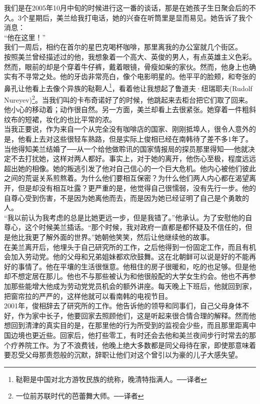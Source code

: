 我们是在2005年10月中旬的时候进行这一番的谈话，那是在她孩子生日聚会后的不久。3个星期后，美兰给我打电话，她的兴奋在听筒里是显而易见。她告诉了我个消息：\\

“他在这里！”\\

我们一周后，相约在首尔的星巴克喝杯咖啡，那里离我的办公室就几个街区。\\

按照美兰曾经描述过的他，我想象着一个高大、英俊的男人，有点英雄主义色彩。然而，眼前的却是个穿着牛仔裤，戴着眼镜，骨瘦如柴的家伙。然而，他身上也确实有不寻常之处。他的牙齿非常亮白，像个电影明星的。他平平的脸颊，和夸张的鼻孔让他看上去像个异族的鞑靼人\footnote{鞑靼是中国对北方游牧民族的统称，晚清特指满人。──译者}，看着他让我想起了鲁道夫·纽瑞耶夫(Rudolf Nureyev)\footnote{一位前苏联时代的芭蕾舞大师。──译者}。当我们叫的卡布奇诺好了的时候，他跳起来去柜台把它们取了回来。他小心的移动着；动作很自然。另一方面，美兰却看上去很紧张。她穿着一件粗斜纹布的短裙，妆化的也比平常的浓。\\

当我正要说，作为来自一个从完全没有咖啡店的国家、刚刚抵埠人，很令人意外的是，他看上去对这些很轻车熟路，但是实际上俊相已经在南韩待了差不多1年了。当他得知美兰结婚了──从一个给他做聆讯的国家情报局的探员那里得知──他就决定不去打扰她，这样对两人都好。事实上，对于她的离开，他伤心至极，程度远远超出她的相像。她的叛逃引发了他对自己信心的一个巨大危机。他内心被他们彼此之间的荒诞关系煎熬着。为什么他们要相互保密？为什么他们两人内心都在渴望离开，但是却没有相互吐露？更严重的是，他觉得自己很懦弱，没有先行一步。他的自尊心受到伤害，不是因为她离他而去，而是因为她已经证明了自己是个勇敢的人。\\

“我以前认为我考虑的总是比她更远一步，但是我错了。”他承认。为了安慰他的自尊心，这个时候美兰插话。“那个时候，我对政府一直都是都怀疑及不信任的，但是他比我更了解外面的世界。”她朝他笑笑，然后让他继续他的故事。\\

在美兰离开后，他埋头于自己研究所的工作，之后他得到一份固定工作，而且有机会加入劳动党。他的父母和兄弟姐妹都欢欣鼓舞。这在北朝鲜可以说是好的不能再好的事情了。他在平壤的生活很惬意。他租住的房子很暖和，吃的也足够。但是他却不想定居在那儿。他也不与那些被认为和他很般配的大学女生约会。他也不再参加那些能增大他成为劳动党党员机会的额外讲座。每天晚上下班后，他就回到家，把窗帘拉的严严的，这样他就可以看南韩的电视节目。\\

2001年，俊相辞去了研究所的工作。他告诉他的领导和同事们，自己父母身体不好，作为家中长子，他要回家去照顾他们，这是听起来很合情合理的解释。然而他想回到清津的真实目的是，在那里他的行为所受到的监视会少些，而且那里距离中国边境也更近些。回家后，他打些零工，有时还会去他和美兰夜间步行时常去的那个疗养院工作。为了不浪费钱，他晚上绝大多数都是同父母待在家，即使那意味着要忍受父母那责怨般的沉默，辞职让他们对这个曾引以为豪的儿子大感失望。\\

